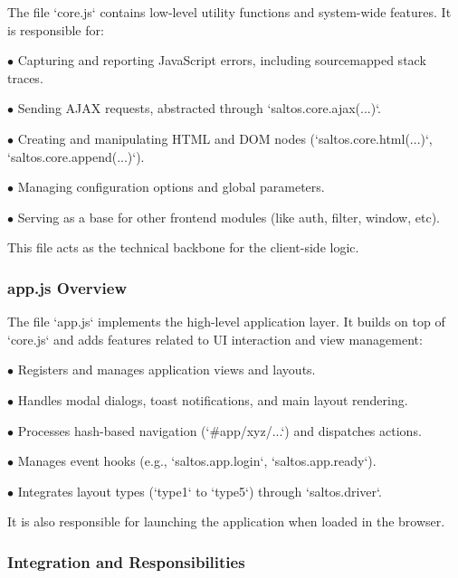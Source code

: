 \documentclass[a4paper]{article}
\begin{document}
The file `core.js` contains low-level utility functions and system-wide features. It is responsible for:

\begin{compactitem}
\item[\color{myblue}$\bullet$] Capturing and reporting JavaScript errors, including sourcemapped stack traces.
\item[\color{myblue}$\bullet$] Sending AJAX requests, abstracted through `saltos.core.ajax(...)`.
\item[\color{myblue}$\bullet$] Creating and manipulating HTML and DOM nodes (`saltos.core.html(...)`, `saltos.core.append(...)`).
\item[\color{myblue}$\bullet$] Managing configuration options and global parameters.
\item[\color{myblue}$\bullet$] Serving as a base for other frontend modules (like auth, filter, window, etc).
\end{compactitem}

This file acts as the technical backbone for the client-side logic.

\hypertarget{toc34}{}
\subsubsection{app.js Overview}

The file `app.js` implements the high-level application layer. It builds on top of `core.js` and adds features related to UI interaction and view management:

\begin{compactitem}
\item[\color{myblue}$\bullet$] Registers and manages application views and layouts.
\item[\color{myblue}$\bullet$] Handles modal dialogs, toast notifications, and main layout rendering.
\item[\color{myblue}$\bullet$] Processes hash-based navigation (`\#app/xyz/...`) and dispatches actions.
\item[\color{myblue}$\bullet$] Manages event hooks (e.g., `saltos.app.login`, `saltos.app.ready`).
\item[\color{myblue}$\bullet$] Integrates layout types (`type1` to `type5`) through `saltos.driver`.
\end{compactitem}

It is also responsible for launching the application when loaded in the browser.

\hypertarget{toc35}{}
\subsubsection{Integration and Responsibilities}
\end{document}
